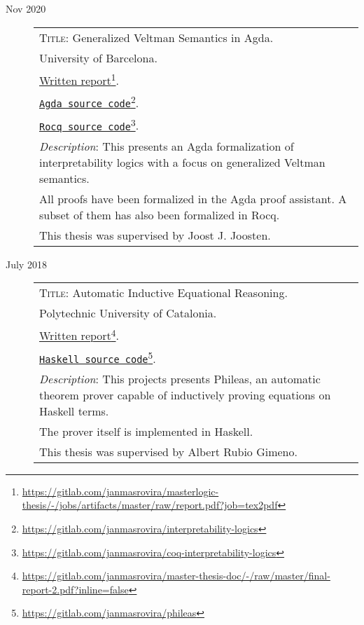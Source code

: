 \documentclass[11pt]{article}
\newcommand{\fnlink}[2]{\href{#1}{#2}\footnote{\url{#1}}}
\begin{document}
\begin{description}
\item[Nov 2020]
\begin{minipage}{\textwidth}

  \begin{tabular}{|p{12cm}}

    \textsc{Title}: Generalized Veltman Semantics in Agda. \\
    University of Barcelona. \\
    \fnlink{https://gitlab.com/janmasrovira/masterlogic-thesis/-/jobs/artifacts/master/raw/report.pdf?job=tex2pdf}{Written report}. \\
    \fnlink{https://gitlab.com/janmasrovira/interpretability-logics}{\texttt{Agda source code}}. \\
    \fnlink{https://gitlab.com/janmasrovira/coq-interpretability-logics}{\texttt{Rocq source code}}. \\
    \textit{Description}: This presents an Agda formalization of interpretability logics with a focus on generalized Veltman semantics.
    \\All proofs have been formalized in the Agda proof assistant. A subset of them has also been formalized in Rocq.
    \\This thesis was supervised by Joost J. Joosten.

  \end{tabular}
\end{minipage}

\item[July 2018]
  \begin{minipage}{\textwidth}
    \begin{tabular}{|p{12cm}}
      \textsc{Title}: Automatic Inductive Equational Reasoning. \\
      Polytechnic University of Catalonia. \\
      \fnlink{https://gitlab.com/janmasrovira/master-thesis-doc/-/raw/master/final-report-2.pdf?inline=false}{Written report}. \\
      \fnlink{https://gitlab.com/janmasrovira/phileas}{\texttt{Haskell source code}}. \\
      \textit{Description}: This projects presents Phileas, an automatic
      theorem prover capable of inductively proving equations on Haskell
      terms.
      \\The prover itself is implemented in Haskell.
      \\This thesis was supervised by Albert Rubio Gimeno.

    \end{tabular}
  \end{minipage}

\end{description}
\end{document}
